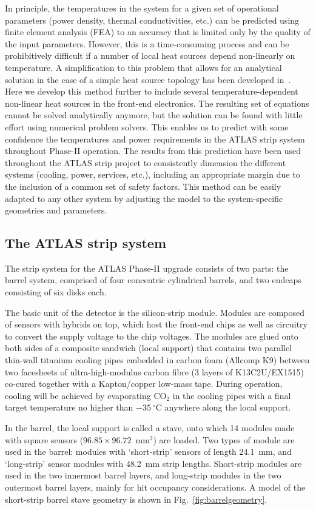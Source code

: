 In principle, the temperatures in the system for a given set of operational parameters (power density, thermal conductivities, etc.) can be predicted using finite element analysis (FEA) to an accuracy that is limited only by the quality of the input parameters. However, this is a time-consuming process and can be prohibitively difficult if a number of local heat sources depend non-linearly on temperature. A simplification to this problem that allows for an analytical solution in the case of a simple heat source topology has been developed in~\cite{Beck:2010zzd}. Here we develop this method further to include several temperature-dependent non-linear heat sources in the front-end electronics. The resulting set of equations cannot be solved analytically anymore, but the solution can be found with little effort using numerical problem solvers. This enables us to predict with some confidence the temperatures and power requirements in the ATLAS strip system throughout Phase-II operation. The results from this prediction have been used throughout the ATLAS strip project to consistently dimension the different systems (cooling, power, services, etc.), including an appropriate margin due to the inclusion of a common set of safety factors. This method can be easily adapted to any other system by adjusting the model to the system-specific geometries and parameters.

\subsection{The ATLAS strip system}
The strip system for the ATLAS Phase-II upgrade consists of two parts: the barrel system, comprised of four concentric cylindrical barrels, and two endcaps consisting of six disks each.

The basic unit of the detector is the silicon-strip module. Modules are composed of sensors with hybrids on top, which host the front-end chips as well as circuitry to convert the supply voltage to the chip voltages. The modules are glued onto both sides of a composite sandwich (local support) that contains two parallel thin-wall titanium cooling pipes embedded in carbon foam (Allcomp K9) between two facesheets of ultra-high-modulus carbon fibre (3 layers of K13C2U/EX1515) co-cured together with a Kapton/copper low-mass tape. During operation, cooling will be achieved by evaporating CO$_2$ in the cooling pipes with a final target temperature no higher than $-35~^\circ$C anywhere along the local support.

In the barrel, the local support is called a stave, onto which 14 modules made with square sensors ($96.85\times 96.72$~mm$^2$) are loaded. Two types of module are used in the barrel: modules with `short-strip' sensors of length 24.1~mm, and `long-strip' sensor modules with 48.2~mm strip lengths. Short-strip modules are used in the two innermost barrel layers, and long-strip modules in the two outermost barrel layers, mainly for hit occupancy considerations. A model of the short-strip barrel stave geometry is shown in Fig.~\ref{fig:barrelgeometry}.


